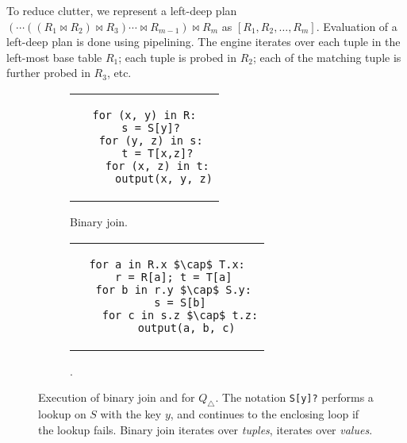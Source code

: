 To reduce clutter, we represent a left-deep plan
$(\cdots ((R_1 \Join R_2) \Join R_3) \cdots \Join R_{m-1}) \Join R_m$
as $[R_1, R_2, \ldots, R_m]$.  Evaluation of a left-deep plan is done
using pipelining.  The engine iterates over each tuple in the
left-most base table $R_1$; each tuple is probed in $R_2$; each of the
matching tuple is further probed in $R_3$, etc.


\begin{figure}
  \begin{subfigure}[b]{0.5\linewidth}
\centering
\begin{tabular}{c}
\begin{lstlisting}
for (x, y) in R:
  s = S[y]?
  for (y, z) in s:
    t = T[x,z]?
    for (x, z) in t:
      output(x, y, z)
\end{lstlisting}
\end{tabular}
\caption{Binary join.}
\label{fig:background:binary-join}
  \end{subfigure}
  \begin{subfigure}[b]{0.45\linewidth}
\centering
\begin{tabular}{c}
\begin{lstlisting}
for a in R.x $\cap$ T.x:
  r = R[a]; t = T[a]
  for b in r.y $\cap$ S.y:
    s = S[b]
    for c in s.z $\cap$ t.z:
      output(a, b, c)
\end{lstlisting}
\end{tabular}
    \caption{\GJ.}
    \label{fig:background:gj}
  \end{subfigure}
  \caption{Execution of binary join and \GJ for $Q_\triangle$.  The
    notation \lstinline|S[y]?| performs a lookup on $S$ with the key
    $y$, and continues to the enclosing loop if the lookup fails.
    Binary join iterates over {\em tuples}, \GJ iterates over {\em
      values}.}
\end{figure}


